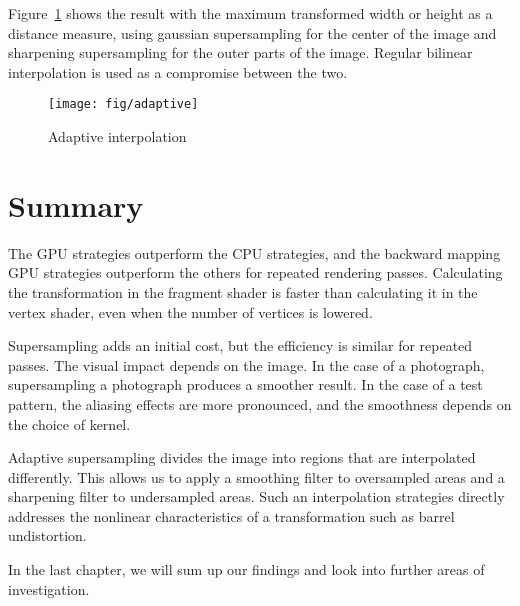 \documentclass[english,12pt]{ifimaster}
\begin{document}
Figure~\ref{fig:adaptive} shows the result with the maximum
transformed width or height as a distance measure, using gaussian
supersampling for the center of the image and sharpening supersampling
for the outer parts of the image. Regular bilinear interpolation is
used as a compromise between the two.

\begin{figure}[b]
  \centering
  \texttt{[image: fig/adaptive]}
  \caption{Adaptive interpolation}
  \label{fig:adaptive}
\end{figure}

\section*{Summary}

The GPU strategies outperform the CPU strategies, and the backward
mapping GPU strategies outperform the others for repeated rendering
passes. Calculating the transformation in the fragment shader is
faster than calculating it in the vertex shader, even when the number
of vertices is lowered.

Supersampling adds an initial cost, but the efficiency is similar for
repeated passes. The visual impact depends on the image. In the case
of a photograph, supersampling a photograph produces a smoother
result. In the case of a test pattern, the aliasing effects are more
pronounced, and the smoothness depends on the choice of kernel.

Adaptive supersampling divides the image into regions that are
interpolated differently. This allows us to apply a smoothing filter
to oversampled areas and a sharpening filter to undersampled areas.
Such an interpolation strategies directly addresses the nonlinear
characteristics of a transformation such as barrel undistortion.

In the last chapter, we will sum up our findings and look into further
areas of investigation.



\end{document}

